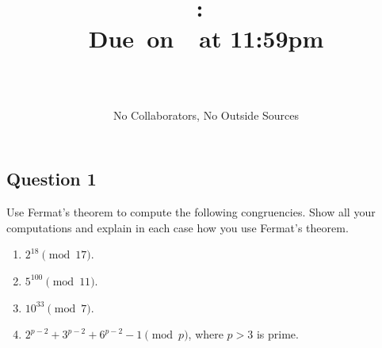 \documentclass{article}
\title{
    \vspace{2in}
    \textbf{\hmwkClass:\ \hmwkTitle}\\
    \normalsize\vspace{0.1in}\small{Due\ on\ \hmwkDueDate\ at 11:59pm}\\
    \vspace{0.1in}\large{\textit{\hmwkClassInstructor}}
    \vspace{3in}
    \author{\textbf{\hmwkAuthorName} \\ \\ \small No Collaborators, No Outside Sources}
    \date{}
}
\begin{document}
\maketitle
\pagebreak

\subsection*{Question 1}
    Use Fermat's theorem to compute the following congruencies. Show all your computations and explain in each case how you use Fermat's theorem.
    \begin{enumerate}
        \item $2^{18} \pmod{17}$.
        \item $5^{100} \pmod{11}$.
        \item $10^{33} \pmod{7}$.
        \item $2^{p-2} + 3^{p-2} + 6^{p-2} - 1 \pmod{p}$, where $p > 3$ is prime.
    \end{enumerate}
\end{document}
